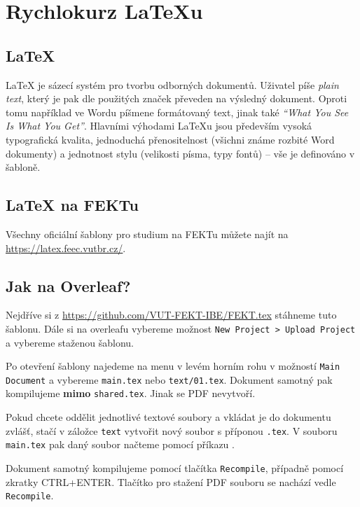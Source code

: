 \clearpage
\section{Rychlokurz LaTeXu}

\subsection{\LaTeX}

\LaTeX{} je sázecí systém pro tvorbu odborných dokumentů.
Uživatel píše \emph{plain text}, který je pak dle použitých značek převeden na výsledný dokument.
Oproti tomu například ve Wordu píšmene formátovaný text, jinak také \emph{\enquote{What You See Is What You Get}}.
Hlavními výhodami \LaTeX{}u jsou především vysoká typografická kvalita, jednoduchá přenositelnost (všichni známe rozbité Word dokumenty) a jednotnost stylu (velikosti písma, typy fontů) -- vše je definováno v šabloně.

\subsection{LaTeX na FEKTu}

Všechny oficiální šablony pro studium na FEKTu můžete najít na 
\url{https://latex.feec.vutbr.cz/}.

\subsection{Jak na Overleaf?}

Nejdříve si z \url{https://github.com/VUT-FEKT-IBE/FEKT.tex}
stáhneme tuto šablonu.
Dále si na overleafu vybereme možnost \texttt{New Project > Upload Project} a vybereme staženou šablonu.

Po otevření šablony najedeme na menu v levém horním rohu v možností \texttt{Main Document} a vybereme \texttt{main.tex} nebo \texttt{text/01.tex}.
Dokument samotný pak kompilujeme \textbf{mimo} \texttt{shared.tex}.
Jinak se PDF nevytvoří.

Pokud chcete oddělit jednotlivé textové soubory a vkládat je do dokumentu zvlášť, stačí v záložce \texttt{text} vytvořit nový soubor s příponou \texttt{.tex}.
V souboru \texttt{main.tex} pak daný soubor načteme pomocí příkazu \verb||.

Dokument samotný kompilujeme pomocí tlačítka \texttt{Recompile}, případně pomocí zkratky CTRL+ENTER.
Tlačítko pro stažení PDF souboru se nachází vedle \texttt{Recompile}.


